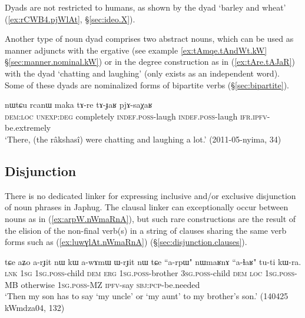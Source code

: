 Dyads are not restricted to humans, as shown by the dyad  `barley and wheat' (\ref{ex:rCWB4.pjWlAt}, §\ref{sec:ideo.X}).

Another type of noun dyad comprises two abstract nouns, which can be used as manner adjuncts with the ergative (see example \ref{ex:tAmqe.tAndWt.kW} §\ref{sec:manner.nominal.kW}) or in the degree construction as in (\ref{ex:tAre.tAJaR}) with the dyad  `chatting and laughing' (only  exists as an independent word). Some of these dyads are nominalized forms of bipartite verbs (§\ref{sec:bipartite}).

\begin{exe}
\ex \label{ex:tAre.tAJaR}
 \gll  nɯtɕu rcanɯ maka tɤ-re tɤ-ɟaʁ pjɤ-saχaʁ \\
 \textsc{dem}:\textsc{loc} \textsc{unexp}:\textsc{deg} completely \textsc{indef}.\textsc{poss}-laugh \textsc{indef}.\textsc{poss}-laugh  \textsc{ifr}.\textsc{ipfv}-be.extremely \\
 \glt `There, (the râkshasî) were chatting and laughing a lot.' (2011-05-nyima, 34)
\end{exe}

\subsection{Disjunction}  \label{sec:disjunction.nouns}
There is no dedicated linker for expressing inclusive and/or exclusive disjunction of noun phrases in Japhug. The clausal linker  can exceptionally occur between nouns as in (\ref{ex:arpW.nWmaRnA}), but such rare constructions are the result of the elision of the non-final verb(s) in a string of clauses sharing the same verb forms such as (\ref{ex:luwɣlAt.nWmaRnA}) (§\ref{sec:disjunction.clauses}).

\begin{exe}
\ex \label{ex:arpW.nWmaRnA}
 \gll tɕe aʑo a-rɟit nɯ kɯ a-wɤmɯ ɯ-rɟit nɯ tɕe ``a-rpɯ" nɯmaʁnɤ ``a-ɬaʁ" tu-ti kɯ-ra. \\
 \textsc{lnk} \textsc{1sg} \textsc{1sg}.\textsc{poss}-child \textsc{dem} \textsc{erg} \textsc{1sg}.\textsc{poss}-brother \textsc{3sg}.\textsc{poss}-child \textsc{dem} \textsc{loc} \textsc{1sg}.\textsc{poss}-MB otherwise \textsc{1sg}.\textsc{poss}-MZ \textsc{ipfv}-say \textsc{sbj}:\textsc{pcp}-be.needed \\
\glt `Then my son has to say `my uncle' or `my aunt' to my brother's son.'  (140425 kWmdza04, 132)
 \end{exe}
 
